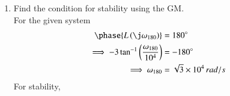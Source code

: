 \begin{enumerate}[label=\arabic*.,ref=\theenumi]
\begin{table}[!ht]
\centering

\caption{}
\label{table:ee18btech11006_Factors}
\end{table}
\item Find the condition for stability using the GM.
\\
\solution 
For the given system 
\begin{align}
\phase{L\brak{\j\omega_{180}}}   &= 180 \degree
\\
\implies     -3\tan^{-1}\brak{{\frac{\omega_{180}}{10^4}}} &= -180 \degree
\\
   \implies \omega_{180} &= \sqrt{3}\times 10^4 \, rad/s
\end{align}
%
For stability, 

\end{enumerate}
